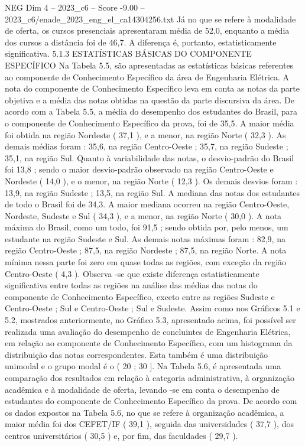 \begin{textsample}{NEG Dim 4 – 2023\_c6 – Score -9.00 – 2023\_c6/enade\_2023\_eng\_el\_ca14304256.txt}
Já no que se refere à modalidade de oferta, os cursos presenciais apresentaram média de 52,0, enquanto a média dos cursos a distância foi de 46,7.
A diferença é, portanto, estatisticamente significativa. 5.1.3 ESTATÍSTICAS BÁSICAS DO COMPONENTE ESPECÍFICO Na Tabela 5.5, são apresentadas as estatísticas básicas referentes ao componente de Conhecimento Específico da área de Engenharia Elétrica.
A nota do componente de Conhecimento Específico leva em conta as notas da parte objetiva e a média das notas obtidas na questão da parte discursiva da área.
De acordo com a Tabela 5.5, a média do desempenho dos estudantes do Brasil, para o componente de Conhecimento Específico da prova, foi de 35,5.
A maior média foi obtida na região Nordeste ( 37,1 ), e a menor, na região Norte ( 32,3 ).
As demais médias foram : 35,6, na região Centro-Oeste ; 35,7, na região Sudeste ; 35,1, na região Sul.
Quanto à variabilidade das notas, o desvio-padrão do Brasil foi 13,8 ; sendo o maior desvio-padrão observado na região Centro-Oeste e Nordeste ( 14,0 ), e o menor, na região Norte ( 12,3 ).
Os demais desvios foram : 13,9, na região Sudeste ; 13,5, na região Sul.
A mediana das notas dos estudantes de todo o Brasil foi de 34,3.
A maior mediana ocorreu na região Centro-Oeste, Nordeste, Sudeste e Sul ( 34,3 ), e a menor, na região Norte ( 30,0 ).
A nota máxima do Brasil, como um todo, foi 91,5 ; sendo obtida por, pelo menos, um estudante na região Sudeste e Sul.
As demais notas máximas foram : 82,9, na região Centro-Oeste ; 87,5, na região Nordeste ; 87,5, na região Norte.
A nota mínima nessa parte foi zero em quase todas as regiões, com exceção da região Centro-Oeste ( 4,3 ).
Observa -se que existe diferença estatisticamente significativa entre todas as regiões na análise das médias das notas do componente de Conhecimento Específico, exceto entre as regiões Sudeste e Centro-Oeste ; Sul e Centro-Oeste ; Sul e Sudeste.
Assim como nos Gráficos 5.1 e 5.2, mostrados anteriormente, no Gráfico 5.3, apresentado acima, foi possível ser realizada uma avaliação do desempenho de concluintes de Engenharia Elétrica, em relação ao componente de Conhecimento Específico, com um histograma da distribuição das notas correspondentes.
Esta também é uma distribuição unimodal e o grupo modal é o ( 20 ; 30 ].
Na Tabela 5.6, é apresentada uma comparação dos resultados em relação à categoria administrativa, à organização acadêmica e à modalidade de oferta, levando -se em conta o desempenho de estudantes do componente de Conhecimento Específico da prova.
De acordo com os dados expostos na Tabela 5.6, no que se refere à organização acadêmica, a maior média foi dos CEFET/IF ( 39,1 ), seguida das universidades ( 37,7 ), dos centros universitários ( 30,5 ) e, por fim, das faculdades ( 29,7 ).

\end{textsample}
